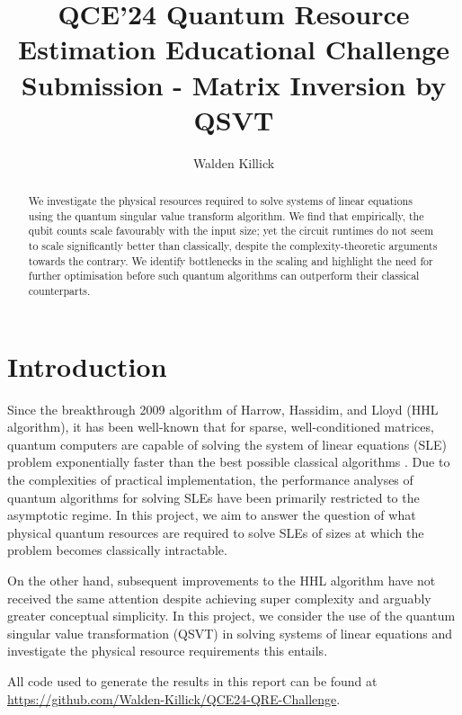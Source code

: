 \documentclass[10pt, twocolumn]{article}
\begin{document}
\title{QCE'24 Quantum Resource Estimation Educational Challenge Submission - Matrix Inversion by QSVT}
\author{Walden Killick}

\maketitle

\begin{abstract}
	We investigate the physical resources required to solve systems of linear equations using the quantum singular value transform algorithm. We find that empirically, the qubit counts scale favourably with the input size; yet the circuit runtimes do not seem to scale significantly better than classically, despite the complexity-theoretic arguments towards the contrary. We identify bottlenecks in the scaling and highlight the need for further optimisation before such quantum algorithms can outperform their classical counterparts.
\end{abstract}

\section{Introduction}

Since the breakthrough 2009 algorithm of Harrow, Hassidim, and Lloyd (HHL algorithm), it has been well-known that for sparse, well-conditioned matrices, quantum computers are capable of solving the system of linear equations (SLE) problem exponentially faster than the best possible classical algorithms \cite{harrow2009quantum}. Due to the complexities of practical implementation, the performance analyses of quantum algorithms for solving SLEs have been primarily restricted to the asymptotic regime. In this project, we aim to answer the question of what physical quantum resources are required to solve SLEs of sizes at which the problem becomes classically intractable.

On the other hand, subsequent improvements to the HHL algorithm have not received the same attention despite achieving super complexity and arguably greater conceptual simplicity. In this project, we consider the use of the quantum singular value transformation (QSVT) \cite{gilyen2019quantum, martyn2021grand} in solving systems of linear equations and investigate the physical resource requirements this entails.

All code used to generate the results in this report can  be found at \href{https://github.com/Walden-Killick/QCE24-QRE-Challenge}{https://github.com/Walden-Killick/QCE24-QRE-Challenge}.
\end{document}

